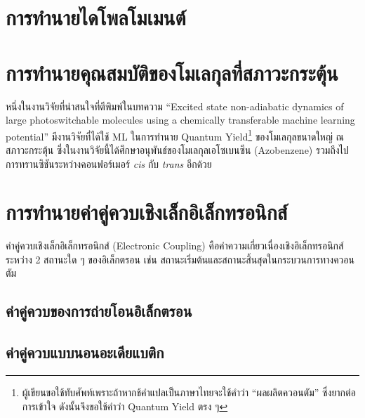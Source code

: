 \section{การทำนายไดโพลโมเมนต์}
\label{sec:pred_dipole_moment}

\section{การทำนายคุณสมบัติของโมเลกุลที่สภาวะกระตุ้น}
\label{sec:pred_ex_prop}

หนึ่งในงานวิจัยที่น่าสนใจที่ตีพิมพ์ในบทความ \enquote{Excited state non-adiabatic dynamics of large photoswitchable molecules 
using a chemically transferable machine learning potential}\autocite{axelrod2022} มีงานวิจัยที่ได้ใช้ ML ในการทำนาย 
Quantum Yield\footnote{ผู้เขียนขอใช้ทับศัพท์เพราะถ้าหากช้คำแปลเป็นภาษาไทยจะใช้คำว่า \enquote{ผลผลิตควอนตัม} ซึ่งยากต่อการเข้าใจ 
ดังนั้นจึงขอใช้คำว่า Quantum Yield ตรง ๆ} ของโมเลกุลขนาดใหญ่ ณ สภาวะกระตุ้น ซึ่งในงานวิจัยนี้ได้ศึกษาอนุพันธ์ของโมเลกุลเอโซเบนซีน 
(Azobenzene) รวมถึงไปการทรานซิชันระหว่างคอนฟอร์เมอร์ \textit{cis} กับ \textit{trans} อีกด้วย

\section{การทำนายค่าคู่ควบเชิงเล็กอิเล็กทรอนิกส์}
\label{sec:pred_elec_coupling}

ค่าคู่ควบเชิงเล็กอิเล็กทรอนิกส์ (Electronic Coupling) คือค่าความเกี่ยวเนื่องเชิงอิเล็กทรอนิกส์ระหว่าง 2 สถานะใด ๆ ของอิเล็กตรอน เช่น 
สถานะเริ่มต้นและสถานะสิ้นสุดในกระบวนการทางควอนตัม 

\subsection{ค่าคู่ควบของการถ่ายโอนอิเล็กตรอน}
\label{ssec:pred_etran_coupling}



\subsection{ค่าคู่ควบแบบนอนอะเดียแบติก}
\label{ssec:nonadia_coupling}



